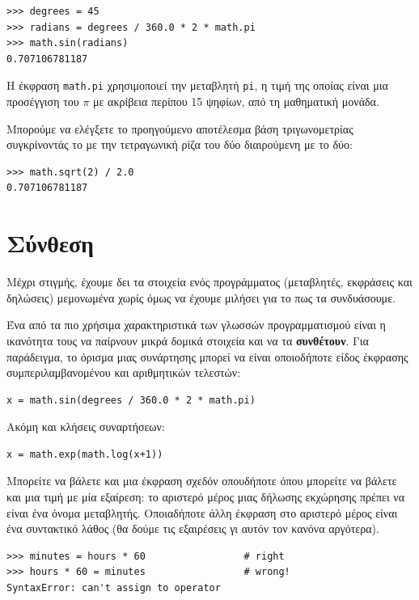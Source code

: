 \documentclass[10pt]{book}
\begin{document}
\begin{verbatim}
>>> degrees = 45
>>> radians = degrees / 360.0 * 2 * math.pi
>>> math.sin(radians)
0.707106781187
\end{verbatim}
%

Η έκφραση {\tt math.pi} χρησιμοποιεί την μεταβλητή {\tt pi}, η τιμή της οποίας είναι μια προσέγγιση του $\pi$ με ακρίβεια περίπου 15 ψηφίων, από τη μαθηματική μονάδα.


Μπορούμε να ελέγξετε το προηγούμενο αποτέλεσμα βάση τριγωνομετρίας 
συγκρίνοντάς το με την τετραγωνική ρίζα του δύο διαιρούμενη με το δύο:


\begin{verbatim}
>>> math.sqrt(2) / 2.0
0.707106781187
\end{verbatim}
%


\section{Σύνθεση}

Μέχρι στιγμής, έχουμε δει τα στοιχεία ενός προγράμματος (μεταβλητές,
εκφράσεις και δηλώσεις) μεμονωμένα χωρίς όμως να έχουμε μιλήσει για το πως
τα συνδυάσουμε.

Ένα από τα πιο χρήσιμα χαρακτηριστικά των γλωσσών προγραμματισμού
είναι η ικανότητα τους να παίρνουν μικρά δομικά στοιχεία και να τα {\bf συνθέτουν}.
Για παράδειγμα, το όρισμα μιας συνάρτησης μπορεί να είναι οποιοδήποτε είδος
έκφρασης συμπεριλαμβανομένου και αριθμητικών τελεστών:


\begin{verbatim}
x = math.sin(degrees / 360.0 * 2 * math.pi)
\end{verbatim}
%

Ακόμη και κλήσεις συναρτήσεων:

\begin{verbatim}
x = math.exp(math.log(x+1))
\end{verbatim}
%

Μπορείτε να βάλετε και μια έκφραση σχεδόν οπουδήποτε όπου μπορείτε να βάλετε και μια τιμή με μία εξαίρεση: το αριστερό μέρος μιας
δήλωσης εκχώρησης πρέπει να είναι ένα όνομα μεταβλητής. Οποιαδήποτε άλλη
έκφραση στο αριστερό μέρος είναι ένα συντακτικό λάθος (θα δούμε τις εξαιρέσεις
γι αυτόν τον κανόνα αργότερα).


\begin{verbatim}
>>> minutes = hours * 60                 # right
>>> hours * 60 = minutes                 # wrong!
SyntaxError: can't assign to operator
\end{verbatim}
%
\end{document}
